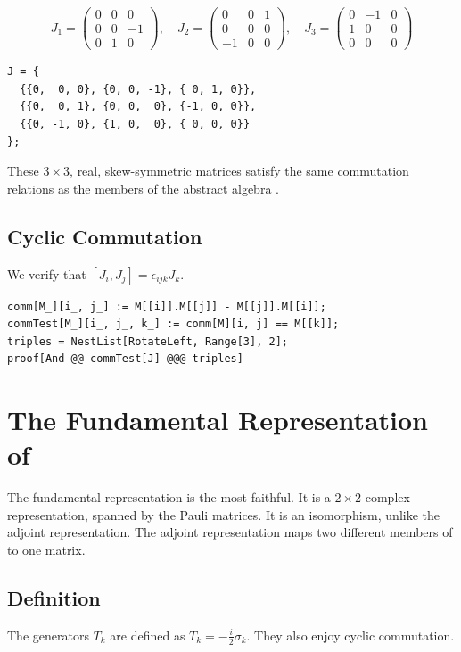 \begin{equation*}
    J_1 = \begin{pmatrix} 0 &  0 & 0 \\ 0 & 0 & -1 \\  0 & 1 & 0 \end{pmatrix}, \quad
    J_2 = \begin{pmatrix} 0 &  0 & 1 \\ 0 & 0 &  0 \\ -1 & 0 & 0 \end{pmatrix}, \quad
    J_3 = \begin{pmatrix} 0 & -1 & 0 \\ 1 & 0 &  0 \\  0 & 0 & 0 \end{pmatrix}
\end{equation*}

\begin{Verbatim}[frame=single, label=Mathematica]
J = {
  {{0,  0, 0}, {0, 0, -1}, { 0, 1, 0}},
  {{0,  0, 1}, {0, 0,  0}, {-1, 0, 0}},
  {{0, -1, 0}, {1, 0,  0}, { 0, 0, 0}}
};
\end{Verbatim}

\noindent These $3\times 3$, real, skew-symmetric matrices satisfy the
same commutation relations as the members of the abstract algebra .

\subsection{Cyclic Commutation}
We verify that $[J_i, J_j] = \epsilon_{ijk} J_k$. 

\begin{Verbatim}[frame=single, label=Mathematica]
comm[M_][i_, j_] := M[[i]].M[[j]] - M[[j]].M[[i]];
commTest[M_][i_, j_, k_] := comm[M][i, j] == M[[k]];
triples = NestList[RotateLeft, Range[3], 2];
proof[And @@ commTest[J] @@@ triples] 
\end{Verbatim}

\section{The Fundamental Representation of }
The fundamental representation is the most faithful. It is a $2\times 2$
complex representation, spanned by the Pauli matrices. It is an isomorphism,
unlike the adjoint representation. The adjoint representation maps two
different members of  to one matrix.

\subsection{Definition}
The generators $T_k$ are defined as $T_k = -\frac{i}{2}\sigma_k$.
They also enjoy cyclic commutation.

